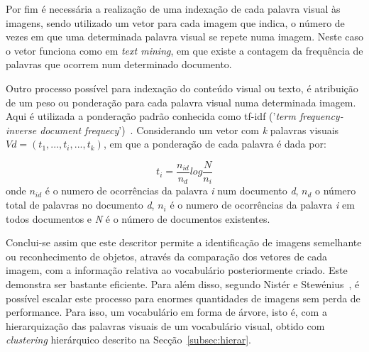 Por fim é necessária a realização de uma indexação de cada palavra visual às imagens, sendo utilizado um vetor para cada imagem que indica, o número de vezes em que uma determinada palavra visual se repete numa imagem. Neste caso o vetor funciona como em \textit{text mining}, em que existe a contagem da frequência de palavras que ocorrem num determinado documento.

Outro processo possível para indexação do conteúdo visual ou texto, é atribuição de um peso ou ponderação para cada palavra visual numa determinada imagem. Aqui é utilizada a ponderação padrão conhecida como tf-idf ('\textit{term frequency-inverse document frequecy}')~\cite{Sivic2003}. Considerando um vetor com \textit{k} palavras visuais $Vd = (t_{1},...,t_{i},...,t_{k})$, em que a ponderação de cada palavra é dada por:

\begin{equation}
t_{i} = \frac{n_{id}}{n_{d}}log\frac{N}{n_{i}}
\label{eq:peso}
\end{equation}
onde $n_{id}$ é o numero de ocorrências da palavra \textit{i} num documento \textit{d}, $n_{d}$ o número total de palavras no documento \textit{d}, $n_{i}$ é o numero de ocorrências da palavra \textit{i} em todos documentos e \textit{N} é o número de documentos existentes. 

Conclui-se assim que este descritor permite a identificação de imagens semelhante ou reconhecimento de objetos, através da comparação dos vetores de cada imagem, com a informação relativa ao vocabulário posteriormente criado. Este demonstra ser bastante eficiente. Para além disso, segundo Nistér e Stewénius~\cite{Nister2006}, é possível escalar este processo para enormes quantidades de imagens sem perda de performance. Para isso, um vocabulário em forma de árvore, isto é, com a hierarquização das palavras visuais de um vocabulário visual, obtido com \textit{clustering} hierárquico descrito na Secção~\ref{subsec:hierar}.

%

